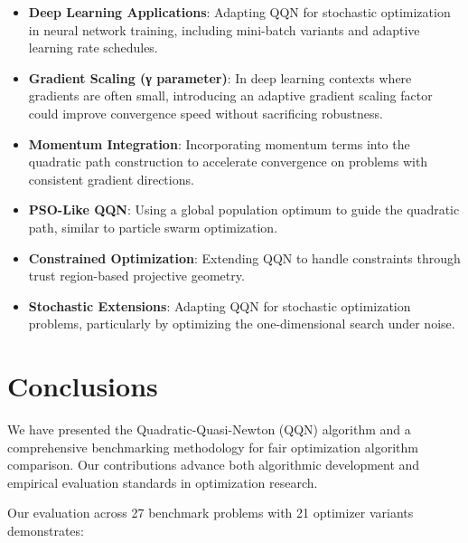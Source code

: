 \begin{itemize}
\tightlist
\item
  \textbf{Deep Learning Applications}: Adapting QQN for stochastic optimization in neural network training, including mini-batch variants and adaptive learning rate schedules.
\item
  \textbf{Gradient Scaling (γ parameter)}: In deep learning contexts where gradients are often small, introducing an adaptive gradient scaling factor could improve convergence speed without sacrificing robustness.
\item
  \textbf{Momentum Integration}: Incorporating momentum terms into the quadratic path construction to accelerate convergence on problems with consistent gradient directions.
\item
  \textbf{PSO-Like QQN}: Using a global population optimum to guide the quadratic path, similar to particle swarm optimization.
\item
  \textbf{Constrained Optimization}: Extending QQN to handle constraints through trust region-based projective geometry.
\item
  \textbf{Stochastic Extensions}: Adapting QQN for stochastic optimization problems, particularly by optimizing the one-dimensional search under noise.
\end{itemize}

\hypertarget{conclusions}{%
\section{Conclusions}\label{conclusions}}

We have presented the Quadratic-Quasi-Newton (QQN) algorithm and a comprehensive benchmarking methodology for fair optimization algorithm comparison. Our contributions advance both algorithmic development and empirical evaluation standards in optimization research.

Our evaluation across 27 benchmark problems with 21 optimizer variants demonstrates:

